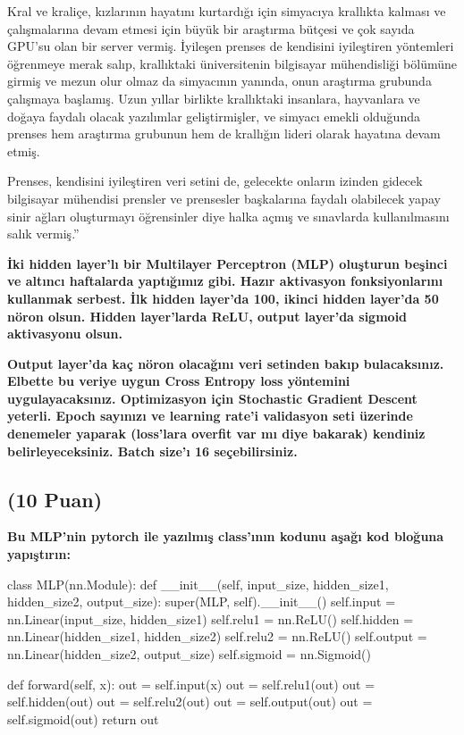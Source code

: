 \documentclass[11pt]{article}
\begin{document}
Kral ve kraliçe, kızlarının hayatını kurtardığı için simyacıya krallıkta kalması ve çalışmalarına devam etmesi için büyük bir araştırma bütçesi ve çok sayıda GPU'su olan bir server vermiş. İyileşen prenses de kendisini iyileştiren yöntemleri öğrenmeye merak salıp, krallıktaki üniversitenin bilgisayar mühendisliği bölümüne girmiş ve mezun olur olmaz da simyacının yanında, onun araştırma grubunda çalışmaya başlamış. Uzun yıllar birlikte krallıktaki insanlara, hayvanlara ve doğaya faydalı olacak yazılımlar geliştirmişler, ve simyacı emekli olduğunda prenses hem araştırma grubunun hem de krallığın lideri olarak hayatına devam etmiş.

Prenses, kendisini iyileştiren veri setini de, gelecekte onların izinden gidecek bilgisayar mühendisi prensler ve prensesler başkalarına faydalı olabilecek yapay sinir ağları oluşturmayı öğrensinler diye halka açmış ve sınavlarda kullanılmasını salık vermiş.''

\textbf{İki hidden layer'lı bir Multilayer Perceptron (MLP) oluşturun beşinci ve altıncı haftalarda yaptığımız gibi. Hazır aktivasyon fonksiyonlarını kullanmak serbest. İlk hidden layer'da 100, ikinci hidden layer'da 50 nöron olsun. Hidden layer'larda ReLU, output layer'da sigmoid aktivasyonu olsun.}

\textbf{Output layer'da kaç nöron olacağını veri setinden bakıp bulacaksınız. Elbette bu veriye uygun Cross Entropy loss yöntemini uygulayacaksınız. Optimizasyon için Stochastic Gradient Descent yeterli. Epoch sayınızı ve learning rate'i validasyon seti üzerinde denemeler yaparak (loss'lara overfit var mı diye bakarak) kendiniz belirleyeceksiniz. Batch size'ı 16 seçebilirsiniz.}

\subsection{(10 Puan)} \textbf{Bu MLP'nin pytorch ile yazılmış class'ının kodunu aşağı kod bloğuna yapıştırın:}

\begin{python}
class MLP(nn.Module):
    def __init__(self, input_size, hidden_size1, hidden_size2, output_size):
        super(MLP, self).__init__()
        self.input = nn.Linear(input_size, hidden_size1)
        self.relu1 = nn.ReLU()
        self.hidden = nn.Linear(hidden_size1, hidden_size2)
        self.relu2 = nn.ReLU()
        self.output = nn.Linear(hidden_size2, output_size)
        self.sigmoid = nn.Sigmoid()

    def forward(self, x):
        out = self.input(x)
        out = self.relu1(out)
        out = self.hidden(out)
        out = self.relu2(out)
        out = self.output(out)
        out = self.sigmoid(out)
        return out
\end{python}
\end{document}
